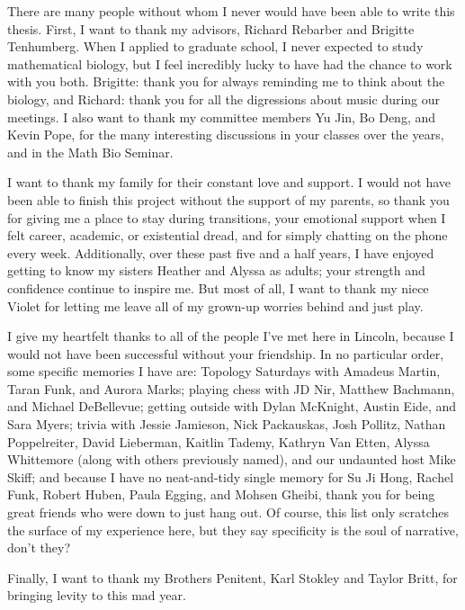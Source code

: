\documentclass[final]{nuthesis}
\theoremstyle{definition}
\numberwithin{theorem}{section}
\numberwithin{lemma}{section}
\numberwithin{corollary}{section}
\numberwithin{definition}{section}
\numberwithin{equation}{section}
\begin{document}
\begin{acknowledgments}
	There are many people without whom I never would have been able to write this thesis. First, I want to thank my advisors, Richard Rebarber and Brigitte Tenhumberg. When I applied to graduate school, I never expected to study mathematical biology, but I feel incredibly lucky to have had the chance to work with you both. Brigitte: thank you for always reminding me to think about the biology, and Richard: thank you for all the digressions about music during our meetings. I also want to thank my committee members Yu Jin, Bo Deng, and Kevin Pope, for the many interesting discussions in your classes over the years, and in the Math Bio Seminar.
	
	I want to thank my family for their constant love and support. I would not have been able to finish this project without the support of my parents, so thank you for giving me a place to stay during transitions, your emotional support when I felt career, academic, or existential dread, and for simply chatting on the phone every week. Additionally, over these past five and a half years, I have enjoyed getting to know my sisters Heather and Alyssa as adults; your strength and confidence continue to inspire me. But most of all, I want to thank my niece Violet for letting me leave all of my grown-up worries behind and just play.
	
	I give my heartfelt thanks to all of the people I've met here in Lincoln, because I would not have been successful without your friendship. In no particular order, some specific memories I have are: Topology Saturdays with Amadeus Martin, Taran Funk, and Aurora Marks; playing chess with JD Nir, Matthew Bachmann, and Michael DeBellevue; getting outside with Dylan McKnight, Austin Eide, and Sara Myers; trivia with Jessie Jamieson, Nick Packauskas, Josh Pollitz, Nathan Poppelreiter, David Lieberman, Kaitlin Tademy, Kathryn Van Etten, Alyssa Whittemore (along with others previously named), and our undaunted host Mike Skiff; and because I have no neat-and-tidy single memory for Su Ji Hong, Rachel Funk, Robert Huben, Paula Egging, and Mohsen Gheibi, thank you for being great friends who were down to just hang out. Of course, this list only scratches the surface of my experience here, but they say specificity is the soul of narrative, don't they?
	
	Finally, I want to thank my Brothers Penitent, Karl Stokley and Taylor Britt, for bringing levity to this mad year.
\end{acknowledgments}
\end{document}
